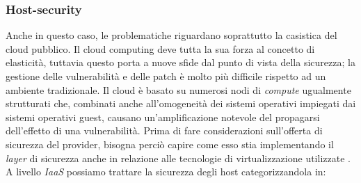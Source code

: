 \documentclass[../main.tex]{subfiles}
\begin{document}
\subsubsection{Host-security}
Anche in questo caso, le problematiche riguardano soprattutto la casistica del cloud pubblico.
Il cloud computing deve tutta la sua forza al concetto di elasticità, tuttavia questo porta a nuove sfide dal punto di vista della sicurezza; la gestione delle vulnerabilità e delle patch è molto più difficile rispetto ad un ambiente tradizionale. Il cloud è basato su numerosi nodi di \textit{compute} ugualmente strutturati che, combinati anche all'omogeneità dei sistemi operativi impiegati dai sistemi operativi guest, causano un'amplificazione notevole del propagarsi dell'effetto di una vulnerabilità.
Prima di fare considerazioni sull'offerta di sicurezza del provider, bisogna perciò capire come esso stia implementando il \textit{layer} di sicurezza anche in relazione alle tecnologie di virtualizzazione utilizzate \cite{CloudSecurityBook}.
A livello \textit{IaaS} possiamo trattare la sicurezza degli host categorizzandola in:
\end{document}
